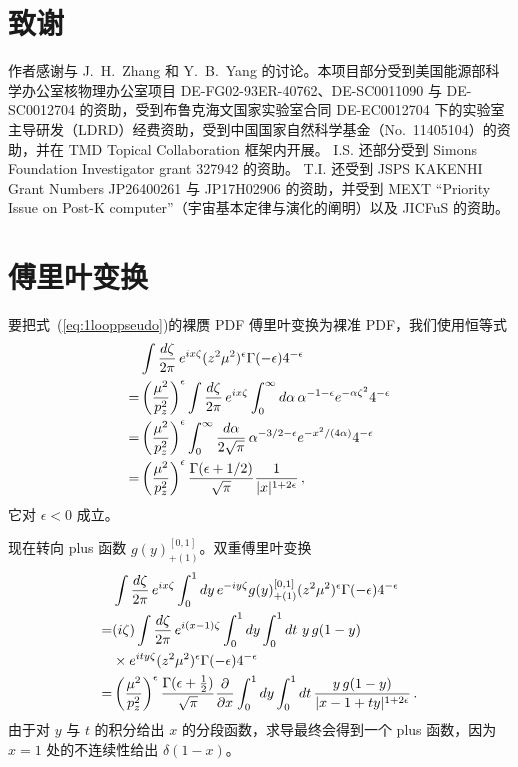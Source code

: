 \section*{致谢}
作者感谢与 J.~H.~Zhang 和 Y.~B.~Yang 的讨论。本项目部分受到美国能源部科学办公室核物理办公室项目 DE-FG02-93ER-40762、DE-SC0011090 与 DE-SC0012704 的资助，受到布鲁克海文国家实验室合同 DE-EC0012704 下的实验室主导研发（LDRD）经费资助，受到中国国家自然科学基金（No.~11405104）的资助，并在 TMD Topical Collaboration 框架内开展。
%
I.S. 还部分受到 Simons Foundation Investigator grant 327942 的资助。
T.I. 还受到 JSPS KAKENHI Grant Numbers JP26400261 与 JP17H02906 的资助，并受到 MEXT ``Priority Issue on Post-K computer''（宇宙基本定律与演化的阐明）以及 JICFuS 的资助。


\appendix

\section{傅里叶变换}
\label{sec:ft}

要把式~(\ref{eq:1looppseudo})的裸赝 PDF 傅里叶变换为裸准 PDF，我们使用恒等式
\begin{align} \label{eq:ft}
&\int {d \zeta \over 2\pi}\, e^{i x \zeta} (z^2\mu^2)^{\epsilon} \Gamma(-\epsilon) 4^{-\epsilon}\\
= & \left({\mu^2\over p_z^2}\right)^\epsilon \int {d \zeta \over 2\pi}\, e^{i x \zeta} \int_0^\infty d\alpha\, \alpha^{-1-\epsilon}e^{-\alpha\zeta^2}4^{-\epsilon}\nonumber\\
=& \left({\mu^2\over p_z^2}\right)^\epsilon \int_0^\infty {d\alpha\over 2\sqrt{\pi}}\, \alpha^{-3/2-\epsilon}e^{-x^2/(4\alpha)}4^{-\epsilon}\nonumber\\
=& \left({\mu^2\over p_z^2}\right)^\epsilon {\Gamma(\epsilon+1/2)\over \sqrt{\pi}} {1\over |x|^{1+2\epsilon}}\,,\nonumber
\end{align}
它对 $\epsilon<0$ 成立。

现在转向 plus 函数 $g(y)^{[0,1]}_{+(1)}$。双重傅里叶变换
\begin{align}
& \int {d \zeta \over 2\pi}\, e^{i x \zeta} \int_0^1 dy\, e^{-iy\zeta} g(y)^{[0,1]}_{+(1)} (z^2\mu^2)^{\epsilon} \Gamma(-\epsilon) 4^{-\epsilon}\nonumber\\
= &(i\zeta)\int {d \zeta \over 2\pi}\, e^{i (x-1) \zeta} \int_0^1 dy \int_0^1 dt\ y\,g(1-y)\nonumber\\
&\times e^{ity\zeta} (z^2\mu^2)^{\epsilon} \Gamma(-\epsilon) 4^{-\epsilon} \nonumber\\
=& \left({\mu^2\over p_z^2}\right)^\epsilon {\Gamma(\epsilon+{1\over2})\over \sqrt{\pi}}{\partial\over \partial x} \int_0^1 dy \int_0^1 dt \, {y\,g(1-y) \over |x-1+ty|^{1+2\epsilon}}\,.
\end{align}
由于对 $y$ 与 $t$ 的积分给出 $x$ 的分段函数，求导最终会得到一个 plus 函数，因为 $x=1$ 处的不连续性给出 $\delta(1-x)$。


